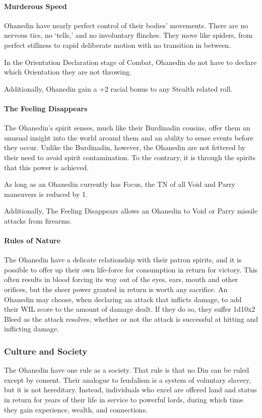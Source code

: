 \documentclass[oneside,11pt,english]{book}
\begin{document}
\paragraph{Murderous Speed}
Ohanedin have nearly perfect control of their bodies' movements. There are no nervous tics, no 
‘tells,’ and no involuntary flinches. They move like spiders, from perfect stillness to rapid 
deliberate motion with no transition in between. 


In the Orientation Declaration stage of Combat, Ohanedin do not have to declare which Orientation they are not throwing. 


Additionally, Ohanedin gain a +2 racial bonus to any Stealth related roll. 
\paragraph{The Feeling Disappears}
The Ohanedin's spirit senses, much like their Burdinadin cousins, offer them an unusual insight 
into the world around them and an ability to sense events before they occur. Unlike the Burdinadin, however, the Ohanedin are not fettered by their need to avoid spirit contamination. 
To the contrary, it is through the spirits that this power is achieved. 


As long as an Ohanedin currently has Focus, the TN of all Void and Parry maneuvers is reduced 
by 1. 


Additionally, The Feeling Disappears allows an Ohanedin to Void or Parry missile attacks from 
firearms. 
\paragraph{Rules of Nature}
The Ohanedin have a delicate relationship with their patron spirits, and it is possible to offer up 
their own life-force for consumption in return for victory. This often results in blood forcing its 
way out of the eyes, ears, mouth and other orifices, but the sheer power granted in return is worth 
any sacrifice. An Ohanedin may choose, when declaring an attack that inflicts damage, to add 
their WIL score to the amount of damage dealt. If they do so, they suffer 1d10x2 Bleed as the 
attack resolves, whether or not the attack is successful at hitting and inflicting damage. 
\subsubsection*{Culture and Society} 
The Ohanedin have one rule as a society. That rule is that no Din can be ruled except by consent. Their 
analogue to feudalism is a system of voluntary slavery, but it is not hereditary. Instead, individuals who 
excel are offered land and status in return for years of their life in service to powerful lords, during which 
time they gain experience, wealth, and connections. 
\end{document}
